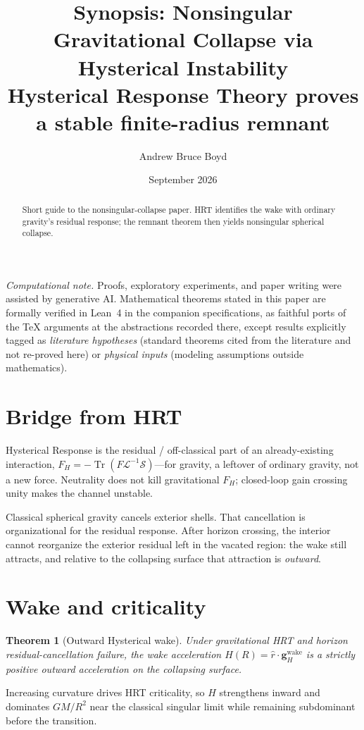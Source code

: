 \documentclass[11pt]{article}
\title{\textbf{Synopsis: Nonsingular Gravitational Collapse via Hysterical Instability}\\[0.35em]
\large Hysterical Response Theory proves a stable finite-radius remnant}
\author{Andrew Bruce Boyd}
\date{September 2026}
\newtheorem{theorem}{Theorem}[section]
\theoremstyle{definition}
\theoremstyle{remark}
\newcommand{\GM}{GM}
\newcommand{\FH}{F_H}
\newcommand{\Tr}{\operatorname{Tr}}
\begin{document}
\maketitle
\noindent\textit{Computational note.}
Proofs, exploratory experiments, and paper writing were assisted by generative AI.
Mathematical theorems stated in this paper are formally verified in Lean~4 in the
companion specifications, as faithful ports of the TeX arguments at the abstractions
recorded there, except results explicitly tagged as \emph{literature hypotheses}
(standard theorems cited from the literature and not re-proved here) or
\emph{physical inputs} (modeling assumptions outside mathematics).

\begin{abstract}
Short guide to the nonsingular-collapse paper.
HRT identifies the wake with ordinary gravity's residual response; the remnant theorem
then yields nonsingular spherical collapse.
\end{abstract}

\section{Bridge from HRT}
Hysterical Response is the residual / off-classical part of an already-existing
interaction,
$\FH=-\Tr(F\mathcal L^{-1}\mathcal S)$---for gravity, a leftover of ordinary gravity,
not a new force.
Neutrality does not kill gravitational $\FH$; closed-loop gain crossing unity makes the
channel unstable.

Classical spherical gravity cancels exterior shells.
That cancellation is organizational for the residual response.
After horizon crossing, the interior cannot reorganize the exterior residual left in the
vacated region: the wake still attracts, and relative to the collapsing surface that
attraction is \emph{outward}.

\section{Wake and criticality}
\begin{theorem}[Outward Hysterical wake]
Under gravitational HRT and horizon residual-cancellation failure, the wake
acceleration $H(R)=\hat r\cdot\mathbf g_H^{\mathrm{wake}}$ is a strictly positive
outward acceleration on the collapsing surface.
\end{theorem}

Increasing curvature drives HRT criticality, so $H$ strengthens inward and dominates
$\GM/R^{2}$ near the classical singular limit while remaining subdominant before the
transition.
\end{document}
